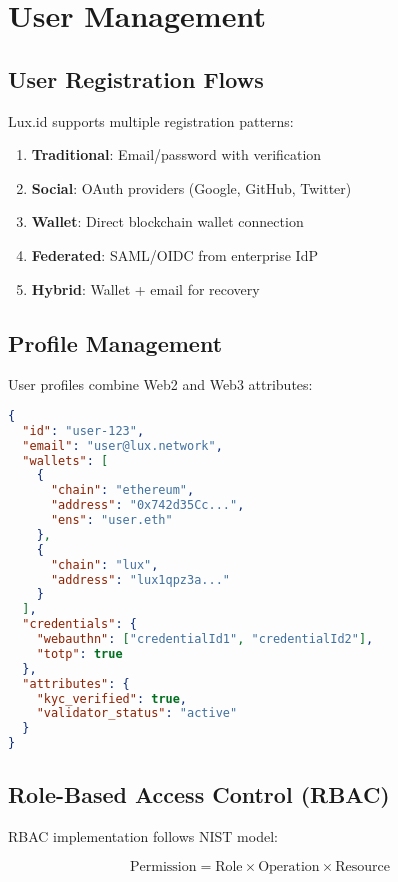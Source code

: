 \documentclass[11pt,a4paper]{article}
\begin{document}
\section{User Management}

\subsection{User Registration Flows}

Lux.id supports multiple registration patterns:

\begin{enumerate}
    \item \textbf{Traditional}: Email/password with verification
    \item \textbf{Social}: OAuth providers (Google, GitHub, Twitter)
    \item \textbf{Wallet}: Direct blockchain wallet connection
    \item \textbf{Federated}: SAML/OIDC from enterprise IdP
    \item \textbf{Hybrid}: Wallet + email for recovery
\end{enumerate}

\subsection{Profile Management}

User profiles combine Web2 and Web3 attributes:

\begin{lstlisting}[language=json]
{
  "id": "user-123",
  "email": "user@lux.network",
  "wallets": [
    {
      "chain": "ethereum",
      "address": "0x742d35Cc...",
      "ens": "user.eth"
    },
    {
      "chain": "lux",
      "address": "lux1qpz3a..."
    }
  ],
  "credentials": {
    "webauthn": ["credentialId1", "credentialId2"],
    "totp": true
  },
  "attributes": {
    "kyc_verified": true,
    "validator_status": "active"
  }
}
\end{lstlisting}

\subsection{Role-Based Access Control (RBAC)}

RBAC implementation follows NIST model:

\begin{equation}
    \text{Permission} = \text{Role} \times \text{Operation} \times \text{Resource}
\end{equation}
\end{document}
